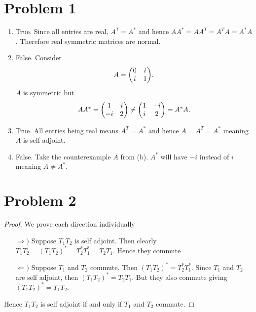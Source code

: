 \documentclass{article}
\begin{document}
\section*{Problem 1}

\begin{enumerate}[label=\alph*)]
    \item True. Since all entries are real, $A^T = A^*$ and hence $A A^* = A A^T = A^T A = A^* A$. Therefore real symmetric matrices are normal.
    \item False. Consider
        \[
            A = \mqty(0 & i \\ i & 1)
        .\]
        $A$ is symmetric but
        \[
            A A^* = \mqty(
            1 & i \\
            -i & 2 \\
            ) \neq \mqty(
            1 & -i \\
            i & 2 \\
            ) = A^* A
        .\]
    \item True. All entries being real means $A^T = A^*$ and hence $A = A^T = A^*$ meaning $A$ is self adjoint.
    \item False. Take the counterexample $A$ from (b). $A^*$ will have $-i$ instead of $i$ meaning $A \neq A^*$.
\end{enumerate}

\section*{Problem 2}
\begin{proof}
    We prove each direction individually
    \begin{enumerate}
        \item[$\Rightarrow)$] Suppose $T_1 T_2$ is self adjoint. Then clearly $T_1 T_2 = (T_1 T_2)^* = T_2^* T_1^* = T_2 T_1$. Hence they commute
        \item[$\Leftarrow)$] Suppose $T_1$ and $T_2$ commute. Then $(T_1 T_2)^* = T_2^* T_1^*$. Since $T_1$ and $T_2$ are self adjoint, then $(T_1 T_2)^* = T_2 T_1$. But they also commute giving $(T_1 T_2)^* = T_1 T_2$.
    \end{enumerate}
    Hence $T_1 T_2$ is self adjoint if and only if $T_1$ and $T_2$ commute. 
\end{proof}
\end{document}

